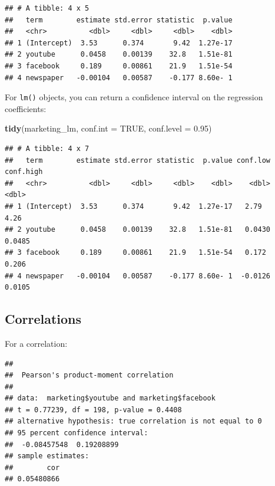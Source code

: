 \documentclass[
]{book}
\newenvironment{Shaded}{\begin{snugshade}}{\end{snugshade}}
\newcommand{\AttributeTok}[1]{\textcolor[rgb]{0.13,0.29,0.53}{#1}}
\newcommand{\ConstantTok}[1]{\textcolor[rgb]{0.56,0.35,0.01}{#1}}
\newcommand{\FloatTok}[1]{\textcolor[rgb]{0.00,0.00,0.81}{#1}}
\newcommand{\FunctionTok}[1]{\textcolor[rgb]{0.13,0.29,0.53}{\textbf{#1}}}
\newcommand{\NormalTok}[1]{#1}
\newcommand{\OtherTok}[1]{\textcolor[rgb]{0.56,0.35,0.01}{#1}}
\newcommand{\SpecialCharTok}[1]{\textcolor[rgb]{0.81,0.36,0.00}{\textbf{#1}}}
\begin{document}
\begin{verbatim}
## # A tibble: 4 x 5
##   term        estimate std.error statistic  p.value
##   <chr>          <dbl>     <dbl>     <dbl>    <dbl>
## 1 (Intercept)  3.53      0.374       9.42  1.27e-17
## 2 youtube      0.0458    0.00139    32.8   1.51e-81
## 3 facebook     0.189     0.00861    21.9   1.51e-54
## 4 newspaper   -0.00104   0.00587    -0.177 8.60e- 1
\end{verbatim}

For \texttt{lm()} objects, you can return a confidence interval on the regression coefficients:

\begin{Shaded}
\begin{Highlighting}[]
\FunctionTok{tidy}\NormalTok{(marketing\_lm, }\AttributeTok{conf.int =} \ConstantTok{TRUE}\NormalTok{, }\AttributeTok{conf.level =} \FloatTok{0.95}\NormalTok{)}
\end{Highlighting}
\end{Shaded}

\begin{verbatim}
## # A tibble: 4 x 7
##   term        estimate std.error statistic  p.value conf.low conf.high
##   <chr>          <dbl>     <dbl>     <dbl>    <dbl>    <dbl>     <dbl>
## 1 (Intercept)  3.53      0.374       9.42  1.27e-17   2.79      4.26  
## 2 youtube      0.0458    0.00139    32.8   1.51e-81   0.0430    0.0485
## 3 facebook     0.189     0.00861    21.9   1.51e-54   0.172     0.206 
## 4 newspaper   -0.00104   0.00587    -0.177 8.60e- 1  -0.0126    0.0105
\end{verbatim}

\subsection{Correlations}\label{correlations-1}

For a correlation:

\begin{Shaded}
\end{Shaded}

\begin{verbatim}
## 
##  Pearson's product-moment correlation
## 
## data:  marketing$youtube and marketing$facebook
## t = 0.77239, df = 198, p-value = 0.4408
## alternative hypothesis: true correlation is not equal to 0
## 95 percent confidence interval:
##  -0.08457548  0.19208899
## sample estimates:
##        cor 
## 0.05480866
\end{verbatim}
\end{document}
